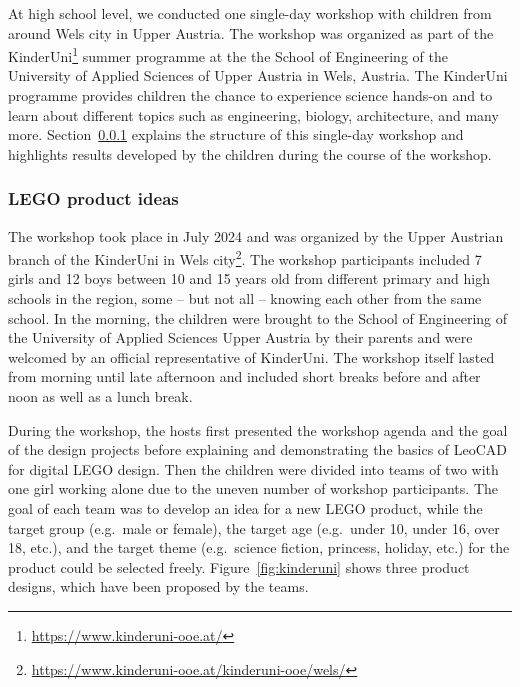 \documentclass{PDS}
\begin{document}
At high school level, we conducted one single-day workshop with children from around Wels city in Upper Austria.
The workshop was organized as part of the KinderUni\footnote{\url{https://www.kinderuni-ooe.at/}} summer programme at the the School of Engineering of the University of Applied Sciences of Upper Austria in Wels, Austria.
The KinderUni programme provides children the chance to experience science hands-on and to learn about different topics such as engineering, biology, architecture, and many more.
Section~\ref{sec:school-lego} explains the structure of this single-day workshop and highlights results developed by the children during the course of the workshop.

\subsubsection{LEGO product ideas}
\label{sec:school-lego}

The workshop took place in July 2024 and was organized by the Upper Austrian branch of the KinderUni in Wels city\footnote{\url{https://www.kinderuni-ooe.at/kinderuni-ooe/wels/}}.
The workshop participants included 7 girls and 12 boys between 10 and 15 years old from different primary and high schools in the region, some -- but not all -- knowing each other from the same school.
In the morning, the children were brought to the School of Engineering of the University of Applied Sciences Upper Austria by their parents and were welcomed by an official representative of KinderUni.
The workshop itself lasted from morning until late afternoon and included short breaks before and after noon as well as a lunch break.

During the workshop, the hosts first presented the workshop agenda and the goal of the design projects before explaining and demonstrating the basics of LeoCAD for digital LEGO design.
Then the children were divided into teams of two with one girl working alone due to the uneven number of workshop participants.
The goal of each team was to develop an idea for a new LEGO product, while the target group (e.g.\ male or female), the target age (e.g.\ under 10, under 16, over 18, etc.), and the target theme (e.g.\ science fiction, princess, holiday, etc.) for the product could be selected freely.
Figure~\ref{fig:kinderuni} shows three product designs, which have been proposed by the teams.
\end{document}
